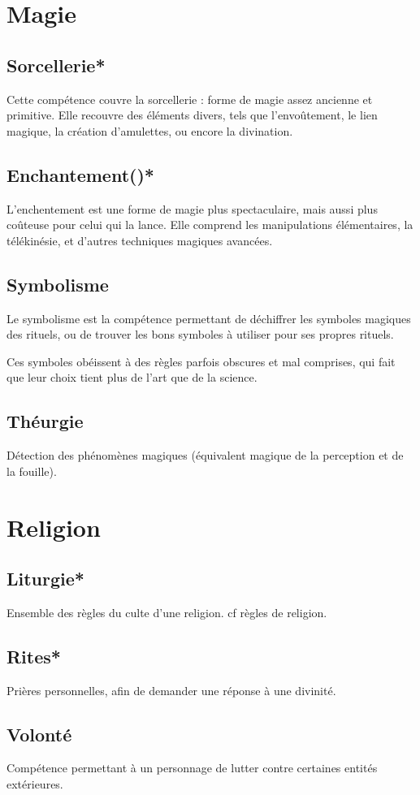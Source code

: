 \documentclass[10pt,a4paper,twocolumn]{book}
\begin{document}
\section{Magie}
\subsection*{Sorcellerie*}
Cette compétence couvre la sorcellerie : forme de magie assez ancienne et primitive. Elle recouvre des éléments divers, tels que l'envoûtement, le lien magique, la création d'amulettes, ou encore la divination.
\subsection*{Enchantement()*}
L'enchentement est une forme de magie plus spectaculaire, mais aussi plus coûteuse pour celui qui la lance. Elle comprend les manipulations élémentaires, la télékinésie, et d'autres techniques magiques avancées.
\subsection*{Symbolisme}
Le symbolisme est la compétence permettant de déchiffrer les symboles magiques des rituels, ou de trouver les bons symboles à utiliser pour ses propres rituels.

Ces symboles obéissent à des règles parfois obscures et mal comprises, qui fait que leur choix tient plus de l'art que de la science.
\subsection*{Théurgie}
Détection des phénomènes magiques (équivalent magique de la perception et de la fouille).
\section{Religion}
\subsection*{Liturgie*}
Ensemble des règles du culte d’une religion. cf règles de religion.
\subsection*{Rites*}
Prières personnelles, afin de demander une réponse à une divinité.
\subsection*{Volonté}
Compétence permettant à un personnage de lutter contre certaines entités extérieures.
\end{document}
